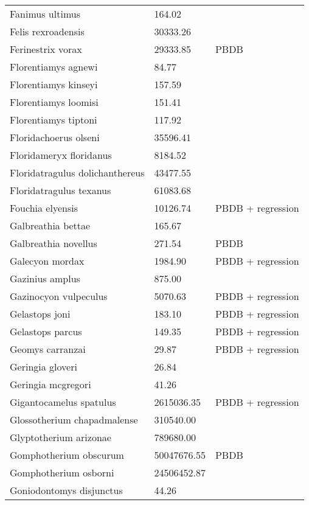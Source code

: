 \begin{center}
\begin{longtable}{p{} p{} p{} }
  Fanimus ultimus & 164.02 & \cite{Tomiya2013} \\ 
  Felis rexroadensis & 30333.26 & \cite{Tomiya2013} \\ 
  Ferinestrix vorax & 29333.85 & PBDB \\ 
  Florentiamys agnewi & 84.77 & \cite{Tomiya2013} \\ 
  Florentiamys kinseyi & 157.59 & \cite{Tomiya2013} \\ 
  Florentiamys loomisi & 151.41 & \cite{Tomiya2013} \\ 
  Florentiamys tiptoni & 117.92 & \cite{Tomiya2013} \\ 
  Floridachoerus olseni & 35596.41 & \cite{Tomiya2013} \\ 
  Floridameryx floridanus & 8184.52 & \cite{Tomiya2013} \\ 
  Floridatragulus dolichanthereus & 43477.55 & \cite{Tomiya2013} \\ 
  Floridatragulus texanus & 61083.68 & \cite{Tomiya2013} \\ 
  Fouchia elyensis & 10126.74 & PBDB + regression \\ 
  Galbreathia bettae & 165.67 & \cite{Tomiya2013} \\ 
  Galbreathia novellus & 271.54 & PBDB \\ 
  Galecyon mordax & 1984.90 & PBDB + regression \\ 
  Gazinius amplus & 875.00 & \cite{Soligo2006} \\ 
  Gazinocyon vulpeculus & 5070.63 & PBDB + regression \\ 
  Gelastops joni & 183.10 & PBDB + regression \\ 
  Gelastops parcus & 149.35 & PBDB + regression \\ 
  Geomys carranzai & 29.87 & PBDB + regression \\ 
  Geringia gloveri & 26.84 & \cite{Tomiya2013} \\ 
  Geringia mcgregori & 41.26 & \cite{Tomiya2013} \\ 
  Gigantocamelus spatulus & 2615036.35 & PBDB + regression \\ 
  Glossotherium chapadmalense & 310540.00 & \cite{McDonald2005} \\ 
  Glyptotherium arizonae & 789680.00 & \cite{McDonald2005} \\ 
  Gomphotherium obscurum & 50047676.55 & PBDB \\ 
  Gomphotherium osborni & 24506452.87 & \cite{Wang2014} \\ 
  Goniodontomys disjunctus & 44.26 & \cite{Tomiya2013} \\ 

\end{longtable}
\end{center}
